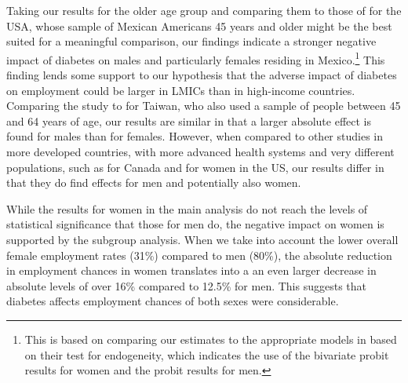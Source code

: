Taking our results for the older age group and comparing
them to those of \textcite{Brown2005} for the USA, whose sample
of Mexican Americans 45 years and older might be the best suited for
a meaningful comparison, our findings indicate a stronger negative
impact of diabetes on males and particularly females residing in Mexico.\footnote{This is based on comparing our estimates to the appropriate
models in \textcite{Brown2005} based on their test for endogeneity,
which indicates the use of the bivariate probit results for women
and the probit results for men. } This finding lends some support to our hypothesis that the adverse
impact of diabetes on employment could be larger in \acp{LMIC} than
in high-income countries. Comparing the study to \textcite{Lin2011b}
for Taiwan, who also used a sample of people between 45 and 64 years
of age, our results are similar in that a larger absolute effect is found for
males than for females. However, when compared
to other studies in more developed countries, with more advanced health
systems and very different populations, such as \textcite{Latif2009}
for Canada and \textcite{Minor2011} for women in the US, our results
differ in that they do find effects for men and potentially also women. 

While the results for women in the main analysis do not reach the levels of statistical significance that those for men do, the negative impact on women is supported by the subgroup analysis. When we take into account the lower overall female employment rates (31\%) compared to men (80\%), the absolute reduction in employment chances in women translates into a an even larger decrease in absolute levels of over 16\% compared to 12.5\% for men. This suggests that diabetes affects employment chances of both sexes were considerable.

